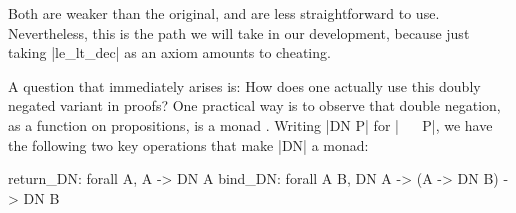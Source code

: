 \documentclass[runningheads]{llncs}
\newcommand{\Exists}[2]{\exists_{#1} \, . \, #2}
\newcommand{\weg}[1]{}
\newcommand{\IR}{{\mathbf R}}
\newcommand{\Inv}{{\rm Inv}}
\newcommand{\contrans}{\rightarrow_C}
\newcommand{\Dur}{{\IR_{\geq 0}}}
\begin{document}
Both are weaker than the original, and are less straightforward to
use. Nevertheless, this is the path we will take in our development,
because just taking |le_lt_dec| as an axiom amounts to cheating.
\weg{ 
A place where we definitely need the stability of the invariant is in
proving the obvious and useful property of {\em transitivity of the
  continuous transition relation}: Suppose we have $(l, p) \contrans
(l, p')$ and $(l, p')\contrans (l, p'')$ for location $l$ and points
$p, p', p''$. 
To show $(l, p)\contrans (l, p'')$, we must show (among other things)
that the invariant holds at each point along the way. That is,
$$\forall t, 0 \leq t \leq d + d' \rightarrow \Inv_l( \Phi_L(p, t)).$$
We know this is true for $0 \leq t \leq d$, and we know that this is
true for $d \leq t \leq d + d'$. Classically, then, the proof is done,
for one can simply distinguish cases $t \leq d$ or $d < t$.  In our
transitivity proof, we will use the variant expressed using double
negation. Now we need only observe that $x \leq y$ is equivalent to $\neg(y < x)$, and that the law of the excluded middle holds under double negation. That is,
$\forall P( \neg  \neg  (P \vee \neg  P))$
is a trivial tautology.
}
A question that immediately arises is: How does one actually use this
doubly negated variant in proofs?  One practical way is to observe
that double negation, as a function on propositions, is a monad
\cite{wadler95monads}. Writing |DN P| for |~ ~ P|, we have the following two key
operations that make |DN| a monad:

\begin{code}
  return_DN: forall A, A -> DN A
  bind_DN: forall A B, DN A -> (A -> DN B) -> DN B
\end{code}
\end{document}
